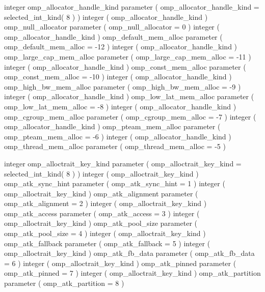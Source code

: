 {\begin{ompfSyntax}
      integer omp_allocator_handle_kind
      parameter ( omp_allocator_handle_kind = selected_int_kind( 8 ) )
      integer ( omp_allocator_handle_kind ) omp_null_allocator
      parameter ( omp_null_allocator = 0 )
      integer ( omp_allocator_handle_kind ) omp_default_mem_alloc
      parameter ( omp_default_mem_alloc = -12 )
      integer ( omp_allocator_handle_kind ) omp_large_cap_mem_alloc
      parameter ( omp_large_cap_mem_alloc = -11 )
      integer ( omp_allocator_handle_kind ) omp_const_mem_alloc
      parameter ( omp_const_mem_alloc = -10 )
      integer ( omp_allocator_handle_kind ) omp_high_bw_mem_alloc
      parameter ( omp_high_bw_mem_alloc = -9 )
      integer ( omp_allocator_handle_kind ) omp_low_lat_mem_alloc
      parameter ( omp_low_lat_mem_alloc = -8 )
      integer ( omp_allocator_handle_kind ) omp_cgroup_mem_alloc
      parameter ( omp_cgroup_mem_alloc = -7 )
      integer ( omp_allocator_handle_kind ) omp_pteam_mem_alloc
      parameter ( omp_pteam_mem_alloc = -6 )
      integer ( omp_allocator_handle_kind ) omp_thread_mem_alloc
      parameter ( omp_thread_mem_alloc = -5 )

      integer omp_alloctrait_key_kind
      parameter ( omp_alloctrait_key_kind = selected_int_kind( 8 ) )
      integer ( omp_alloctrait_key_kind ) omp_atk_sync_hint
      parameter ( omp_atk_sync_hint = 1 )
      integer ( omp_alloctrait_key_kind ) omp_atk_alignment
      parameter ( omp_atk_alignment = 2 )
      integer ( omp_alloctrait_key_kind ) omp_atk_access
      parameter ( omp_atk_access = 3 )
      integer ( omp_alloctrait_key_kind ) omp_atk_pool_size
      parameter ( omp_atk_pool_size = 4 )
      integer ( omp_alloctrait_key_kind ) omp_atk_fallback
      parameter ( omp_atk_fallback = 5 )
      integer ( omp_alloctrait_key_kind ) omp_atk_fb_data
      parameter ( omp_atk_fb_data = 6 )
      integer ( omp_alloctrait_key_kind ) omp_atk_pinned
      parameter ( omp_atk_pinned = 7 )
      integer ( omp_alloctrait_key_kind ) omp_atk_partition
      parameter ( omp_atk_partition = 8 )


\end{ompfSyntax}}
